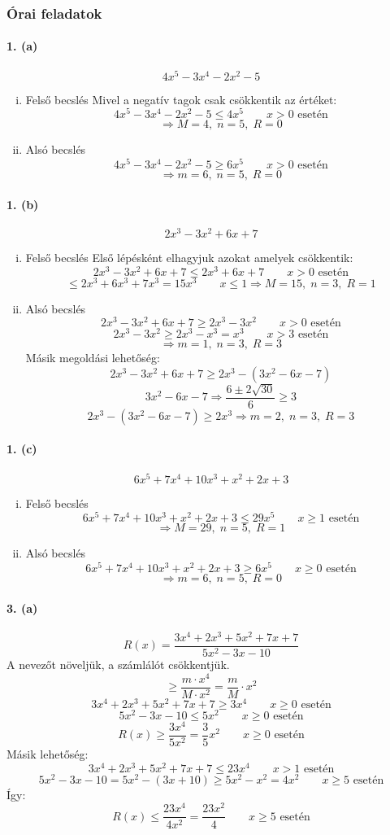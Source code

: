 \documentclass[12pt,a4paper,fleqn]{article}
\newcommand{\myparagraph}[1]{\paragraph{#1}\mbox{}}
\begin{document}
\subsubsection{Órai feladatok}

\myparagraph{1. (a)}
\[ 4x^5 - 3x^4 - 2x^2 - 5 \]
\begin{enumerate}[i.]
  \item Felső becslés
  Mivel a negatív tagok csak csökkentik az értéket:
  \[ 4x^5 - 3x^4 - 2x^2 - 5 \leq 4x^5 \qquad x > 0 \text{ esetén} \]
  \[ \Rightarrow M = 4,\; n = 5,\; R = 0 \]
  \item Alsó becslés
  \[ 4x^5 - 3x^4 - 2x^2 - 5 \geq 6x^5 \qquad x > 0 \text{ esetén} \]
  \[ \Rightarrow m = 6,\; n = 5,\; R = 0 \]
\end{enumerate}

\myparagraph{1. (b)}
\[ 2x^3 - 3x^2 + 6x + 7 \]
\begin{enumerate}[i.]
  \item Felső becslés
  Első lépésként elhagyjuk azokat amelyek csökkentik:
  \[ 2x^3 - 3x^2 + 6x + 7 \leq 2x^3 + 6x + 7 \qquad x > 0 \text{ esetén} \]
  \[ \leq 2x^3+6x^3+7x^3 = 15x^3 \qquad x \leq 1 \Rightarrow M = 15,\; n = 3,\; R = 1 \]
  \item Alsó becslés
  \[ 2x^3 - 3x^2 + 6x + 7 \geq 2x^3 - 3x^2 \qquad x > 0 \text{ esetén} \]
  \[ 2x^3 - 3x^2 \geq 2x^3 - x^3 = x^3 \qquad x > 3 \text{ esetén} \]
  \[ \Rightarrow m = 1,\; n = 3,\; R = 3 \]
  Másik megoldási lehetőség:
  \[ 2x^3 - 3x^2 + 6x + 7 \geq 2x^3 - (3x^2 - 6x - 7) \]
  \[ 3x^2 - 6x - 7 \Rightarrow \dfrac{6 \pm 2\sqrt{30}}{6} \geq 3\]
  \[ 2x^3 - (3x^2 - 6x - 7) \geq 2x^3 \Rightarrow m = 2,\; n = 3,\; R = 3 \]
\end{enumerate}

\myparagraph{1. (c)}
\[ 6x^5 + 7x^4 + 10x^3 + x^2 + 2x + 3 \]
\begin{enumerate}[i.]
  \item Felső becslés
  \[ 6x^5 + 7x^4 + 10x^3 + x^2 + 2x + 3 \leq 29x^5 \qquad x \geq 1 \text{ esetén}\]
  \[ \Rightarrow M = 29,\; n = 5,\; R = 1 \]
  \item Alsó becslés
  \[ 6x^5 + 7x^4 + 10x^3 + x^2 + 2x + 3 \geq 6x^5 \qquad x \geq 0 \text{ esetén}\]
  \[ \Rightarrow m = 6,\; n = 5,\; R = 0 \]
\end{enumerate}

\myparagraph{3. (a)}
\[ R(x) = \dfrac{3x^4 + 2x^3 + 5x^2 + 7x + 7}{5x^2 - 3x -10} \]
A nevezőt növeljük, a számlálót csökkentjük.
\[ \geq \dfrac{m \cdot x^4}{M \cdot x^2} = \dfrac{m}{M} \cdot x^2\]
\[ 3x^4 + 2x^3 + 5x^2 + 7x + 7 \geq 3x^4 \qquad x \geq 0 \text{ esetén} \]
\[ 5x^2 - 3x -10 \leq 5x^2 \qquad x \geq 0 \text{ esetén} \]
\[ R(x) \geq \dfrac{3x^4}{5x^2} = \dfrac{3}{5}x^2 \qquad x \geq 0 \text{ esetén} \]
Másik lehetőség:
\[ 3x^4 + 2x^3 + 5x^2 + 7x + 7 \leq 23x^4 \qquad x > 1 \text{ esetén} \]
\[ 5x^2 - 3x -10 = 5x^2 -(3x + 10) \geq 5x^2-x^2 = 4x^2 \qquad x \geq 5 \text{ esetén} \]
Így:
\[ R(x) \leq \dfrac{23x^4}{4x^2} = \dfrac{23x^2}{4} \qquad x \geq 5 \text{ esetén} \]
\end{document}
